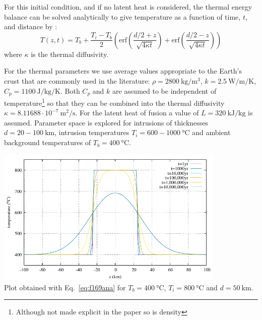 For this initial condition, and if no latent
heat is considered, the thermal energy balance
can be solved analytically to give temperature as
a function of time, $t$, and distance by \cite{jaeg64}:
\begin{equation}
T(z,t)=T_b + \frac{T_i-T_b}{2} 
\left(
\text{erf} \left( \frac{d/2 +z}{\sqrt{4\kappa t}} \right)
+
\text{erf} \left( \frac{d/2 -z}{\sqrt{4\kappa t}} \right)
\right)
\label{eq:f169ana}
\end{equation}
where $\kappa$ is the thermal diffusivity.


For the thermal parameters we use average
values appropriate to the Earth's crust that are
commonly used in the literature:
$\rho=2800~\si{\kg\per\cubic\meter}$, $k=2.5~\si{\watt\per\meter\per\kelvin}$, $C_p=1100~\si{\joule\per\kg\per\kelvin}$.
Both $C_p$ and $k$ are assumed to be independent of
temperature\footnote{Although not made explicit in the 
paper so is density} 
so that they can be combined into the thermal 
diffusivity $\kappa=8.11688\cdot10^{-7}~\si{\square\meter\per\second}$.
For the latent heat of fusion a value
of $L = 320~\si{\kilo\joule\per\kg}$ is assumed. Parameter space
is explored for intrusions of thicknesses $d = 20 - 100~\si{\km}$, 
intrusion temperatures $T_i = 600-1000~\si{\celsius}$
and ambient background temperatures of $T_b =400~\si{\celsius}$. 


\begin{center}
\includegraphics[width=11cm]{python_codes/fieldstone_169/images/solution.pdf}\\
{\captionfont Plot obtained 
with Eq.~\eqref{eq:f169ana}
for $T_b=400~\si{\celsius}$, $T_i=800~\si{\celsius}$ and $d=50~\si{\km}$.}
\end{center}


